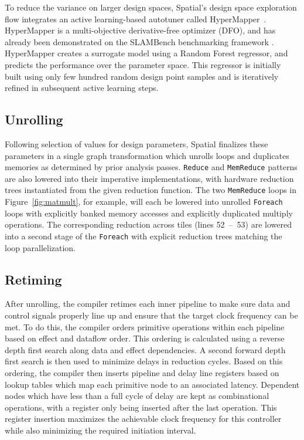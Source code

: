 {To reduce the variance on larger design spaces, Spatial's design space exploration flow integrates an active learning-based autotuner called HyperMapper~\cite{Bodin2016:PACT16,NardiBSVDK17,Saeedi_ICRA_2017}.
HyperMapper is a multi-objective derivative-free optimizer (DFO), and has already been demonstrated on the SLAMBench benchmarking framework \cite{nardi2015introducing}.
HyperMapper creates a surrogate model using a Random Forest regressor, and predicts the performance over the parameter space. This regressor is initially built using only few hundred random design point samples and is iteratively refined in subsequent active learning steps.

\subsection{Unrolling}
Following selection of values for design parameters, Spatial finalizes these parameters in a single graph transformation which unrolls loops and duplicates memories as determined by prior analysis passes.
\texttt{Reduce} and \texttt{MemReduce} patterns are also lowered into their imperative implementations, with hardware reduction trees instantiated from the given reduction function.
The two \texttt{MemReduce} loops in Figure~\ref{fig:matmult}, for example, will each be lowered into unrolled \texttt{Foreach} loops with explicitly banked memory accesses and explicitly duplicated multiply operations. The corresponding reduction across tiles (lines 52~--~53) are lowered into a second stage of the \texttt{Foreach} with explicit reduction trees matching the loop parallelization.

\subsection{Retiming}
After unrolling, the compiler retimes each inner pipeline to make sure data and control signals properly line up and ensure that the target clock frequency can be met.
To do this, the compiler orders primitive operations within each pipeline based on effect and dataflow order.
This ordering is calculated using a reverse depth first search along data and effect dependencies.
A second forward depth first search is then used to minimize delays in reduction cycles.
Based on this ordering, the compiler then inserts pipeline and delay line registers based on lookup tables which map each primitive node to an associated latency. Dependent nodes which have less than a full cycle of delay are kept as combinational operations, with a register only being inserted after the last operation.
This register insertion maximizes the achievable clock frequency for this controller while also minimizing the required initiation interval.

}
